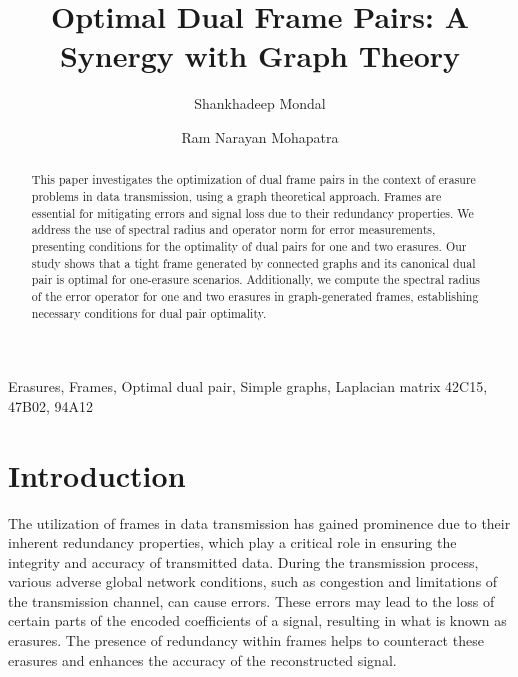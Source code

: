 \documentclass[final,1p,times]{elsarticle}
\begin{document}
	\begin{frontmatter}
	
		\title{ Optimal Dual Frame Pairs: A Synergy with Graph Theory}
		\author{Shankhadeep Mondal}
		\author{Ram Narayan Mohapatra}
		
		
		\address{School of Mathematics, University of Central Florida, Orlando, Florida-32816}
		
		
		\begin{abstract}
			This paper investigates the optimization of dual frame pairs in the context of erasure problems in data transmission, using a graph theoretical approach. Frames are essential for mitigating errors and signal loss due to their redundancy properties. We address the use of spectral radius and operator norm for error measurements, presenting conditions for the optimality of dual pairs for one and two erasures. Our study shows that a tight frame generated by connected graphs and its canonical dual pair is optimal for one-erasure scenarios. Additionally, we compute the spectral radius of the error operator for one and two erasures in graph-generated frames, establishing necessary conditions for dual pair optimality.
		\end{abstract}
		
		
		
		
		
		\begin{keyword}
			Erasures, Frames, Optimal dual pair, Simple graphs, Laplacian matrix
			\MSC[2010] 42C15, 47B02, 94A12
		\end{keyword}
		
	\end{frontmatter}
	
	\section{Introduction}
	
	The utilization of frames in data transmission has gained prominence due to their inherent redundancy properties, which play a critical role in ensuring the integrity and accuracy of transmitted data. During the transmission process, various adverse global network conditions, such as congestion and limitations of the transmission channel, can cause errors. These errors may lead to the loss of certain parts of the encoded coefficients of a signal, resulting in what is known as erasures. The presence of redundancy within frames helps to counteract these erasures and enhances the accuracy of the reconstructed signal.
	
\end{document}
